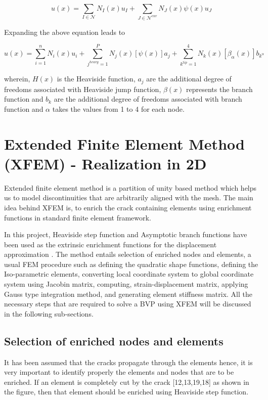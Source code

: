 \documentclass[fleqn, 12.5pt,a4paper]{report}
\begin{document}
$$u(x) = \sum_{I\in \mathscr{N}} N_I(x) u_I + \sum_{J\in \mathscr{N}^{enr}} N_J(x)\psi(x) u_J $$ 

Expanding the above equation leads to

$$u(x) = \sum_{i=1}^n N_i(x) u_i + \sum_{j^{heavy}=1}^P N_j(x)[\psi(x)] a_j + \sum_{k^{tip}=1}^4 N_k(x)[\beta_{\alpha}(x)] b_{k^\alpha} $$\newline

wherein, $H(x)$ is the Heaviside function, $a_j$ are the additional degree of freedoms
associated with Heaviside jump function, $\beta(x)$ represents the branch function and $b_k$ are the additional degree of freedoms associated with branch function and $\alpha$ takes the values from 1 to 4 for each node\cite{khoei2014extended}.

\section{\color{Black} \large{Extended Finite Element Method (XFEM) - Realization in 2D}}
Extended finite element method is a partition of unity based method which helps us to model discontinuities that are arbitrarily aligned with the mesh. The main idea behind XFEM is, to enrich the crack containing elements using enrichment functions in standard finite element framework\cite{ahmed2009extended}.\newline 

In this project, Heaviside step function and Asymptotic branch functions have been used as the extrinsic enrichment functions for the displacement approximation\cite{ahmed2009extended} . The method entails selection of enriched nodes and elements, a usual FEM procedure such as defining the quadratic shape functions, defining the Iso-parametric elements, converting local coordinate system to global coordinate system using Jacobin matrix, computing, strain-displacement matrix, applying Gauss type integration method, and generating element stiffness matrix. All the necessary steps that are required to solve a BVP using XFEM will be discussed in the following sub-sections.

\subsection{\color{Black} {Selection of enriched nodes and elements}}
It has been assumed that the cracks propagate through the elements \cite{belytschko1999elastic} hence, it is very important to identify properly the elements and nodes that are to be enriched. If an element is completely cut by the crack [12,13,19,18] as shown in the figure, then that element should be enriched using Heaviside step function\cite{khoei2014extended}.
\end{document}
